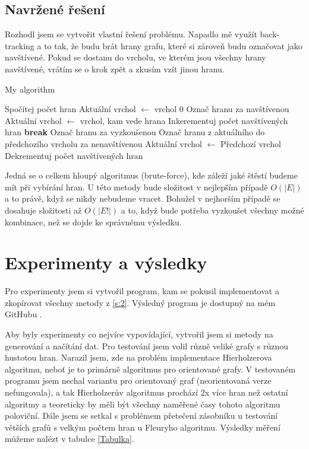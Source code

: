 \documentclass[12pt, a4paper]{article}
\newcommand{\Break}{\State \textbf{break} }
\begin{document}
\subsection{Navržené řešení}
Rozhodl jsem se vytvořit vlastní řešení problému. Napadlo mě využít back-tracking a to tak, že budu brát hrany grafu, které si zároveň budu označovat jako navštívené. Pokud se dostanu do vrcholu, ve kterém jsou všechny hrany navštívené, vrátím se o krok zpět a zkusím vzít jinou hranu.
\begin{algorithm}
\caption{My algorithm}\label{euclid}
\begin{algorithmic} [1]
\State Spočítej počet hran
\State Aktuální vrchol $\gets$ vrchol 0
			\State Označ hranu za navštívenou
			\State Aktuální vrchol $\gets$ vrchol, kam vede hrana
			\State Inkerementuj počet navštívených hran 
			\Break
		\Else
			\State Označ hranu za vyzkoušenou
		\EndIf 
	\EndWhile
		\State Označ hranu z aktuálního do předchozího vrcholu za nenavštívenou
		\State Aktuální vrchol $\gets$ Předchozí vrchol
		\State Dekrementuj počet navštívených hran
	\EndIf 
\EndWhile 
\end{algorithmic}
\end{algorithm}

Jedná se o celkem hloupý algoritmus (brute-force), kde záleží jaké štěstí budeme mít při vybírání hran. U této metody bude složitost v nejlepším případě $O(|E|)$ a to právě, když se nikdy nebudeme vracet. Bohužel v nejhorším případě se dosahuje složitosti až $O(|E!|)$ a to, když bude potřeba vyzkoušet všechny možné kombinace, než se dojde ke správnému výsledku.

\section{Experimenty a výsledky}
Pro experimenty jsem si vytvořil program, kam se pokusil implementovat a zkopírovat všechny metody z \ref{s:2}. Výsledný program je dostupný na mém GitHubu \cite{ReseniMoje}.

Aby byly experimenty co nejvíce vypovídající, vytvořil jsem si metody na generování a načítání dat. Pro testování jsem volil různě veliké grafy s různou hustotou hran. Narazil jsem, zde na problém implementace Hierholzerova algoritmu, neboť je to primárně algoritmus pro orientované grafy. V testovaném programu jsem nechal variantu pro orientovaný graf (neorientovaná verze nefungovala), a tak Hierholzerův algoritmus prochází 2x více hran než ostatní algoritmy a teoreticky by měli být všechny naměřené časy tohoto algoritmu poloviční. Dále jsem se setkal s problémem přetečení zásobníku u testování větších grafů s velkým počtem hran u Fleuryho algoritmu. Výsledky měření můžeme nalézt v tabulce \ref{Tabulka}.
\end{document}
